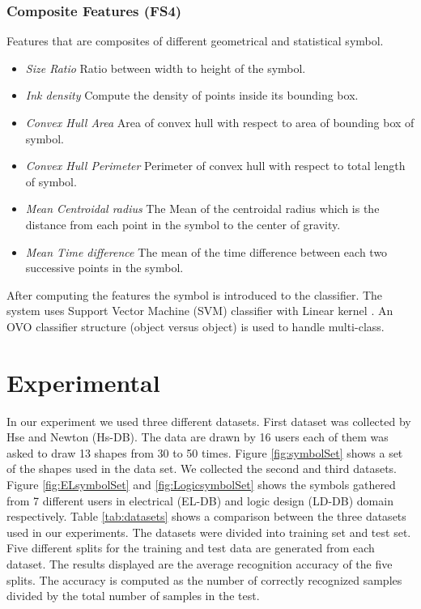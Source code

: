 \documentclass[preprint,10pt,5p,twocolumn]{elsarticle}
\begin{document}
\subsubsection{Composite Features (FS4)}
 Features that are composites of different geometrical and statistical symbol. 
	\begin{itemize}
\item \emph{Size Ratio} Ratio between width to height of the symbol.
	\item \emph{Ink density} Compute the density of points inside its bounding box\cite{GeometryAndDomain102}.   
 	\item \emph{Convex Hull Area} Area of convex hull with respect to area of bounding box of symbol.
	\item \emph{Convex Hull Perimeter} Perimeter of convex hull with respect to total length of symbol.
		\item \emph{Mean Centroidal radius} The Mean of the centroidal radius which is the distance from each point in the symbol to the center of gravity.
	
	\item \emph{Mean Time difference} The mean of the time difference between each two successive points in the symbol. %
  \end{itemize}
  
  
After computing the features the symbol is introduced to the classifier. The system uses Support Vector Machine (SVM) classifier with Linear kernel \cite{libsvm}. An OVO classifier structure (object versus object) is used to handle multi-class.%

\section{Experimental}
\label{sec:Experiments}
In our experiment we used three different datasets. First dataset was collected by Hse and Newton\cite{HeloiseBeautification} (Hs-DB). The data are drawn by 16 users each of them was asked to draw 13 shapes from 30 to 50 times. Figure \ref{fig:symbolSet} shows a set of the shapes used in the data set. We collected the second and third datasets. Figure \ref{fig:ELsymbolSet} and \ref{fig:LogicsymbolSet} shows the symbols gathered from 7 different users in electrical (EL-DB) and logic design (LD-DB) domain respectively.  Table \ref{tab:datasets} shows a  comparison between the three datasets used in our experiments. The datasets were divided into training set and test set. Five different splits  for the training and test data are generated from each dataset. The results displayed are the average recognition accuracy of the five splits. The accuracy is computed as the number of correctly recognized samples divided by the total number of samples in the test. 
\end{document}

